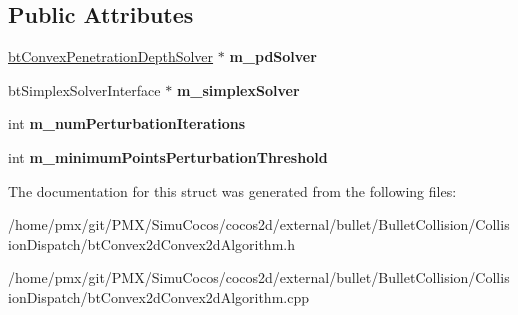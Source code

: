 \subsection*{Public Attributes}
\begin{DoxyCompactItemize}
\item 
\mbox{\label{structbtConvex2dConvex2dAlgorithm_1_1CreateFunc_aacf1d0c98c7690e44a6dddcdc7cb26f8}} 
\hyperlink{classbtConvexPenetrationDepthSolver}{bt\+Convex\+Penetration\+Depth\+Solver} $\ast$ {\bfseries m\+\_\+pd\+Solver}
\item 
\mbox{\label{structbtConvex2dConvex2dAlgorithm_1_1CreateFunc_aff9ad74e57a1690dd3256aca30d25c75}} 
bt\+Simplex\+Solver\+Interface $\ast$ {\bfseries m\+\_\+simplex\+Solver}
\item 
\mbox{\label{structbtConvex2dConvex2dAlgorithm_1_1CreateFunc_a53e70c03f177dbdc5f59058e33b0b5b1}} 
int {\bfseries m\+\_\+num\+Perturbation\+Iterations}
\item 
\mbox{\label{structbtConvex2dConvex2dAlgorithm_1_1CreateFunc_ad811e694cf9b3ba17294be04a9b04d6a}} 
int {\bfseries m\+\_\+minimum\+Points\+Perturbation\+Threshold}
\end{DoxyCompactItemize}


The documentation for this struct was generated from the following files\+:\begin{DoxyCompactItemize}
\item 
/home/pmx/git/\+P\+M\+X/\+Simu\+Cocos/cocos2d/external/bullet/\+Bullet\+Collision/\+Collision\+Dispatch/bt\+Convex2d\+Convex2d\+Algorithm.\+h\item 
/home/pmx/git/\+P\+M\+X/\+Simu\+Cocos/cocos2d/external/bullet/\+Bullet\+Collision/\+Collision\+Dispatch/bt\+Convex2d\+Convex2d\+Algorithm.\+cpp\end{DoxyCompactItemize}
